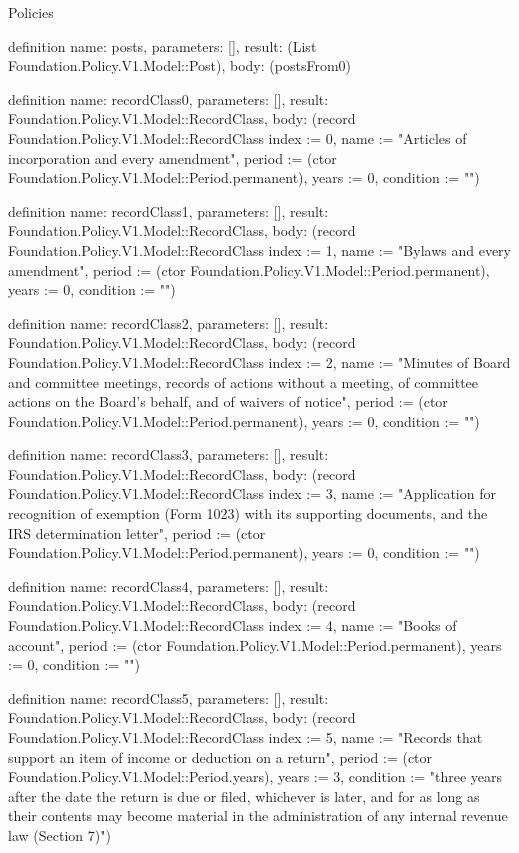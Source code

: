 \begin{lexlean}{Policies}
\begin{semanticmodule}
definition{
  name: posts,
  parameters: [],
  result: (List Foundation.Policy.V1.Model::Post),
  body: (postsFrom0)
}

definition{
  name: recordClass0,
  parameters: [],
  result: Foundation.Policy.V1.Model::RecordClass,
  body: (record Foundation.Policy.V1.Model::RecordClass {index := 0, name := "Articles of incorporation and every amendment", period := (ctor Foundation.Policy.V1.Model::Period.permanent), years := 0, condition := ""})
}

definition{
  name: recordClass1,
  parameters: [],
  result: Foundation.Policy.V1.Model::RecordClass,
  body: (record Foundation.Policy.V1.Model::RecordClass {index := 1, name := "Bylaws and every amendment", period := (ctor Foundation.Policy.V1.Model::Period.permanent), years := 0, condition := ""})
}

definition{
  name: recordClass2,
  parameters: [],
  result: Foundation.Policy.V1.Model::RecordClass,
  body: (record Foundation.Policy.V1.Model::RecordClass {index := 2, name := "Minutes of Board and committee meetings, records of actions without a meeting, of committee actions on the Board's behalf, and of waivers of notice", period := (ctor Foundation.Policy.V1.Model::Period.permanent), years := 0, condition := ""})
}

definition{
  name: recordClass3,
  parameters: [],
  result: Foundation.Policy.V1.Model::RecordClass,
  body: (record Foundation.Policy.V1.Model::RecordClass {index := 3, name := "Application for recognition of exemption (Form 1023) with its supporting documents, and the IRS determination letter", period := (ctor Foundation.Policy.V1.Model::Period.permanent), years := 0, condition := ""})
}

definition{
  name: recordClass4,
  parameters: [],
  result: Foundation.Policy.V1.Model::RecordClass,
  body: (record Foundation.Policy.V1.Model::RecordClass {index := 4, name := "Books of account", period := (ctor Foundation.Policy.V1.Model::Period.permanent), years := 0, condition := ""})
}

definition{
  name: recordClass5,
  parameters: [],
  result: Foundation.Policy.V1.Model::RecordClass,
  body: (record Foundation.Policy.V1.Model::RecordClass {index := 5, name := "Records that support an item of income or deduction on a return", period := (ctor Foundation.Policy.V1.Model::Period.years), years := 3, condition := "three years after the date the return is due or filed, whichever is later, and for as long as their contents may become material in the administration of any internal revenue law (Section 7)"})
}


\end{semanticmodule}
\end{lexlean}
